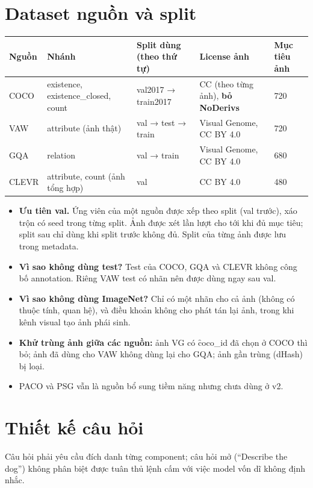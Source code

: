 \documentclass[10.5pt]{article}
\begin{document}
\section{Dataset nguồn và split}
\begin{longtable}{p{1.7cm}p{2.6cm}p{3.6cm}p{3.2cm}p{2.6cm}}
\toprule
\textbf{Nguồn} & \textbf{Nhánh} & \textbf{Split dùng (theo thứ tự)} & \textbf{License ảnh} & \textbf{Mục tiêu ảnh}\\
\midrule
COCO & existence, existence\_closed, count & val2017 → train2017 & CC (theo từng ảnh), \textbf{bỏ NoDerivs} & 720\\
VAW & attribute (ảnh thật) & val → test → train & Visual Genome, CC BY 4.0 & 720\\
GQA & relation & val → train & Visual Genome, CC BY 4.0 & 680\\
CLEVR & attribute, count (ảnh tổng hợp) & val & CC BY 4.0 & 480\\
\bottomrule
\end{longtable}
\begin{itemize}
\item \textbf{Ưu tiên val.} Ứng viên của một nguồn được xếp theo split (val trước), xáo trộn có seed trong
  từng split. Ảnh được xét lần lượt cho tới khi đủ mục tiêu; split sau chỉ dùng khi split trước không đủ.
  Split của từng ảnh được lưu trong metadata.
\item \textbf{Vì sao không dùng test?} Test của COCO, GQA và CLEVR không công bố annotation. Riêng VAW test có
  nhãn nên được dùng ngay sau val.
\item \textbf{Vì sao không dùng ImageNet?} Chỉ có một nhãn cho cả ảnh (không có thuộc tính, quan hệ), và
  điều khoản không cho phát tán lại ảnh, trong khi kênh visual tạo ảnh phái sinh.
\item \textbf{Khử trùng ảnh giữa các nguồn:} ảnh VG có \f{coco\_id} đã chọn ở COCO thì bỏ; ảnh đã dùng cho VAW
  không dùng lại cho GQA; ảnh gần trùng (dHash) bị loại.
\item PACO và PSG vẫn là nguồn bổ sung tiềm năng nhưng chưa dùng ở v2.
\end{itemize}

\section{Thiết kế câu hỏi}
Câu hỏi phải yêu cầu đích danh từng component; câu hỏi mở (``Describe the dog'') không phân biệt được tuân
thủ lệnh cấm với việc model vốn dĩ không định nhắc.
\end{document}
